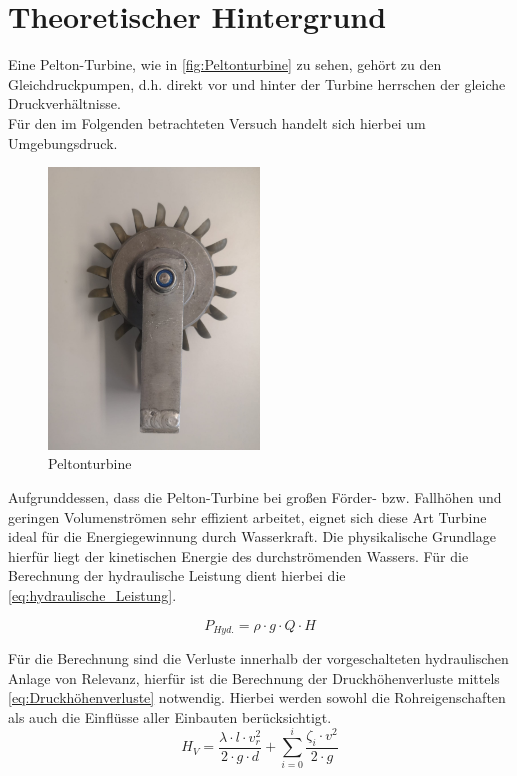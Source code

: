 \section{Theoretischer Hintergrund}
Eine Pelton-Turbine, wie in \autoref{fig:Peltonturbine} zu sehen, gehört zu den Gleichdruckpumpen, d.h. direkt vor und hinter der Turbine herrschen der gleiche Druckverhältnisse.\\
Für den im Folgenden betrachteten Versuch handelt sich hierbei um Umgebungsdruck.\\
\begin{figure}[H]
    \centering
    \includegraphics[width=0.5\textwidth]{Abbildungen/Peltonturbine.jpeg}
    \caption{Peltonturbine}
    \label{fig:Peltonturbine}
\end{figure}

Aufgrunddessen, dass die Pelton-Turbine bei großen Förder- bzw. Fallhöhen und geringen Volumenströmen sehr effizient arbeitet,
eignet sich diese Art Turbine ideal für die Energiegewinnung durch Wasserkraft.
Die physikalische Grundlage hierfür liegt der kinetischen Energie des durchströmenden Wassers.
Für die Berechnung der hydraulische Leistung dient hierbei die \autoref{eq:hydraulische_Leistung}.

\begin{equation}
    P_{Hyd.} = \rho \cdot g \cdot Q \cdot H
    \label{eq:hydraulische_Leistung}
  \end{equation}

Für die Berechnung sind die Verluste innerhalb der vorgeschalteten hydraulischen Anlage von Relevanz,
hierfür ist die Berechnung der Druckhöhenverluste mittels \autoref{eq:Druckhöhenverluste} notwendig.
Hierbei werden sowohl die Rohreigenschaften als auch die Einflüsse aller Einbauten berücksichtigt.
\begin{equation}
    H_{V} = \frac{\lambda \cdot l \cdot v_{r}^2}{2 \cdot g \cdot d} + \sum_{i=0}^{i} \frac{\zeta_{i} \cdot v^2}{2 \cdot g}
    \label{eq:Druckhöhenverluste}
\end{equation}

